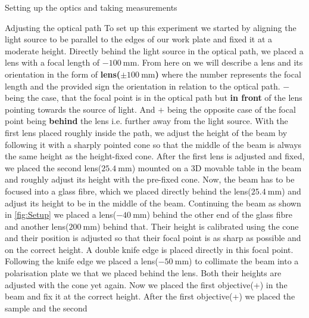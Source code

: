 \documentclass[pdftex, a4paper,11pt, twoside, UKenglish]{report}
\begin{document}
\begin{chapter}{Setting up the optics and taking measurements}
    \newpage
    \begin{section}{Adjusting the optical path}
      \label{chp:SetupOptics}
      To set up this experiment we started by aligning the light source to be
      parallel to the edges of our work plate and fixed it at a moderate height.
      Directly behind the light source in the optical path, we placed a lens
      with a focal length of $\SI{-100}{\milli\meter}$. \newline
      From here on we will describe a lens and its orientation in the form of
      \textbf{lens($\pm \SI{100}{\milli\meter}$)} where the number
      represents the focal length and the provided sign the orientation in
      relation to the optical path. $-$ being the case, that the focal point is
      in the optical path but \textbf{in front} of the lens pointing towards the
      source of light. And $+$ being the opposite case of the focal point being
      \textbf{behind} the lens i.e. further away from the light source. \newline
      With the first lens placed roughly inside the path, we adjust the height
      of the beam by following it with a sharply pointed cone so that the middle
      of the beam is always the same height as the height-fixed cone.
      After the first lens is adjusted and fixed, we placed the second 
      lens($\SI{+25.4}{\milli\meter}$) mounted on a 3D movable table in the beam
      and roughly adjust its height with the pre-fixed cone.
      Now, the beam has to be focused into a glass fibre, which we placed
      directly behind the lens($\SI{+25.4}{\milli\meter}$) and adjust its height
      to be in the middle of the beam. Continuing the beam as shown in
      \cref{fig:Setup} we placed a lens($\SI{-40}{\milli\meter}$) behind the
      other end of the glass fibre and another lens($\SI{+200}{\milli\meter}$)
      behind that. Their height is calibrated using the cone and their position
      is adjusted so that their focal point is as sharp as possible and on the
      correct height.
      A double knife edge is placed directly in this focal point.\newline
      Following the knife edge we placed a lens($\SI{-50}{\milli\meter}$) to
      collimate the beam into a polarisation plate we that we placed behind the
      lens. Both their heights are adjusted with the cone yet again.
      Now we placed the first objective(+) in the beam and fix it at the correct
      height. After the first objective(+) we placed the sample and the second

\end{section}
\end{chapter}
\end{document}
